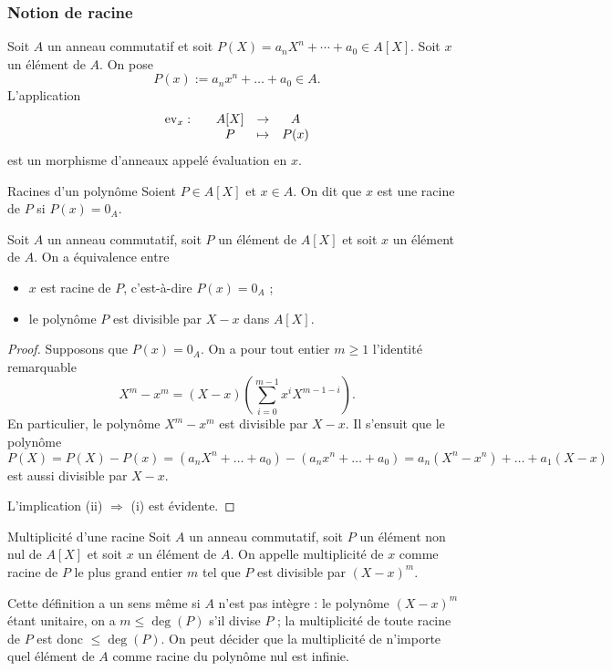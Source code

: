 \documentclass[]{report}
\begin{document}
\subsubsection{Notion de racine}

Soit $A$ un anneau commutatif et soit $P(X) = a_n X^n + \cdots + a_0 \in A[X]$. Soit $x$ un élément de $A$. On pose
\[P(x) := a_n x^n + \dots + a_0 \in A.\]
L'application
\[\begin{array}{ccccc} \mathrm{ev}_x : & & A[X] & \to & A \\ & & P & \mapsto & P(x) \end{array}\]
est un morphisme d'anneaux appelé évaluation en $x$.

\begin{df}{Racines d'un polynôme}{}
    Soient $P \in A[X]$ et $x \in A$. On dit que $x$ est une racine de $P$ si $P(x) = 0_A$.
\end{df}

\begin{prop}{}{}
    Soit $A$ un anneau commutatif, soit $P$ un élément de $A[X]$ et soit $x$ un élément de $A$. On a équivalence entre
    \begin{itemize}
        \item[(i)] $x$ est racine de $P$, c'est-à-dire $P(x) = 0_A$ ;
        \item[(ii)] le polynôme $P$ est divisible par $X - x$ dans $A[X]$.
    \end{itemize}
\end{prop}

\begin{proof}{}{}
    Supposons que $P(x) = 0_A$. On a pour tout entier $m \ge 1$ l'identité remarquable
    \[X^m - x^m = (X - x)\left(\sum_{i = 0}^{m - 1} x^i X^{m - 1 - i}\right).\]
    En particulier, le polynôme $X^m - x^m$ est divisible par $X - x$. Il s'ensuit que le polynôme
    \[P(X) = P(X) - P(x) = \left(a_n X^n + \dots + a_0\right) - \left(a_n x^n + \dots + a_0\right) = a_n(X^n - x^n) + \dots + a_1(X - x)\]
    est aussi divisible par $X - x$.

    L'implication (ii) $\Rightarrow$ (i) est évidente.
\end{proof}

\begin{df}{Multiplicité d'une racine}{}
    Soit $A$ un anneau commutatif, soit $P$ un élément non nul de $A[X]$ et soit $x$ un élément de $A$. On appelle multiplicité de $x$ comme racine de $P$ le plus grand entier $m$ tel que $P$ est divisible par $(X - x)^m$.

    Cette définition a un sens même si $A$ n'est pas intègre : le polynôme $(X - x)^m$ étant unitaire, on a $m \le \deg(P)$ s'il divise $P$ ; la multiplicité de toute racine de $P$ est donc $\le \deg(P)$. On peut décider que la multiplicité de n'importe quel élément de $A$ comme racine du polynôme nul est infinie.
\end{df}
\end{document}

